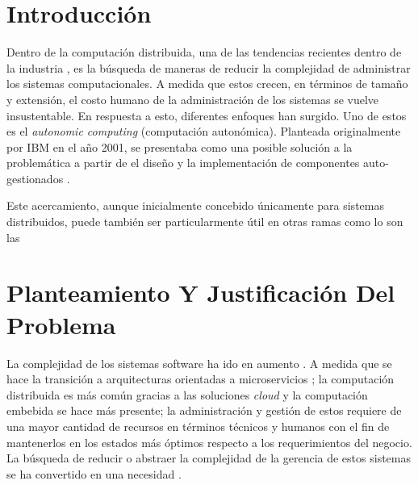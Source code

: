 \documentclass[12pt]{article}
\begin{document}
    
    
    \section{Introducción}


    Dentro de la computación distribuida, una de las tendencias recientes dentro de la industria , es la búsqueda de maneras de reducir la complejidad de administrar los sistemas computacionales. A medida que estos crecen, en términos de tamaño y extensión, el costo humano de la administración de los sistemas se vuelve insustentable. En respuesta a esto, diferentes enfoques han surgido. Uno de estos es el \textit{autonomic computing} (computación autonómica). Planteada originalmente por IBM en el año 2001, se presentaba como una posible solución a la problemática a partir de el diseño y la implementación de componentes auto-gestionados \cite{jeff_2011}. 


    Este acercamiento, aunque inicialmente concebido únicamente para sistemas distribuidos, puede también ser particularmente útil en otras ramas como lo son las 


    \section{Planteamiento Y Justificación Del Problema}
    
    La complejidad de los sistemas software ha ido en aumento \cite[pp.~4-5]{horn_2001}. A medida que se hace la transición a arquitecturas orientadas a microservicios \cite{forrester_research_2019}; la computación distribuida es más común gracias a las soluciones \textit{cloud} \cite{the_cloud_in_2021} y la computación embebida se hace más presente\cite{deichmann_2022}; la administración y gestión de estos requiere de una mayor cantidad de recursos en términos técnicos y humanos con el fin de mantenerlos en los estados más óptimos respecto a los requerimientos del negocio. La búsqueda de reducir o abstraer la complejidad de la gerencia de estos sistemas se ha convertido en una necesidad \cite{lalanda_diaconescu_mccann_2014}.
    
\end{document}
